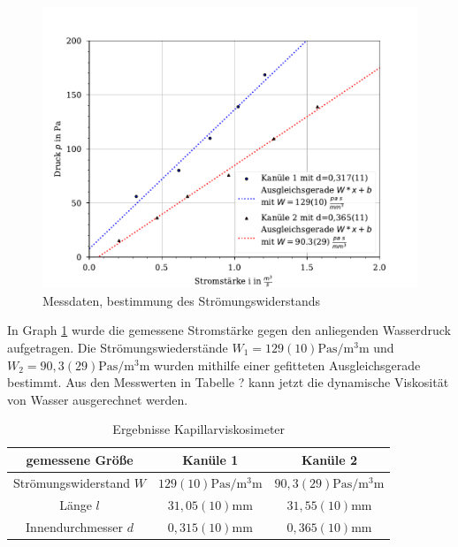 \documentclass[11pt, a4paper]{article}
\begin{document}
    \begin{figure}
        \centering
        \includegraphics[width=\textwidth]{./1Plot.pdf}

        \caption{Messdaten, bestimmung des Strömungswiderstands}
        \label{fig:mess}
    \end{figure}
    In Graph \ref{fig:mess} wurde die gemessene Stromstärke gegen den anliegenden Wasserdruck aufgetragen.
    Die Strömungswiederstände $W_1 = 129(10) \si{\pascal\second\per\cubic\milli\metre}$ und 
    $W_2 = 90,3(29) \si{\pascal\second\per\cubic\milli\metre}$ wurden mithilfe einer gefitteten Ausgleichsgerade
    bestimmt. Aus den Messwerten in Tabelle ? kann jetzt die dynamische Viskosität von Wasser
    ausgerechnet werden.
    \begin{table}
        \centering
        \begin{tabular}{c c c}
            gemessene Größe & Kanüle 1 & Kanüle 2 \\ \hline
            Strömungswiderstand $W$ & $129(10) \si{\pascal\second\per\cubic\milli\metre}$ & $90,3(29) \si{\pascal\second\per\cubic\milli\metre}$ \\
            Länge $l$ & $31,05(10) \si{\milli\metre}$ & $31,55(10) \si{\milli\metre}$ \\
            Innendurchmesser $d$ & $0,315(10) \si{\milli\metre}$ & $0,365(10) \si{\milli\metre}$ \\
            
        \end{tabular}
        \caption{Ergebnisse Kapillarviskosimeter}
        \label{tab:results2}
    \end{table}
\end{document}

